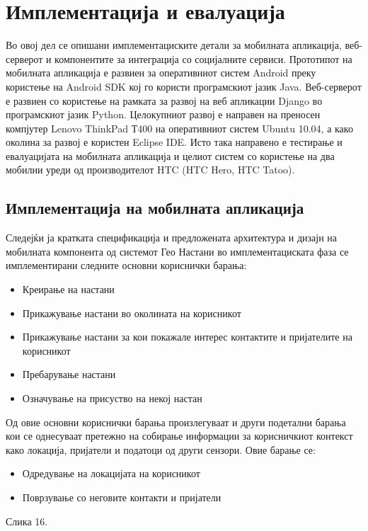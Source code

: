 \chapter{Имплементација и евалуација} 

Во овој дел се опишани имплементациските детали за мобилната апликација,
веб-серверот и компонентите за интеграција со социјалните сервиси. Прототипот на мобилната апликација е развиен за
оперативниот систем Android преку користење на Android SDK кој го користи
програмскиот јазик Java. Веб-серверот е развиен со користење на рамката за
развој на веб апликации Django во програмскиот јазик Python. Целокупниот развој
е направен на преносен компјутер Lenovo ThinkPad Т400 на оперативниот систем
Ubuntu 10.04, а како околина за развој е користен Eclipse IDE. Исто така
направено е тестирање и евалуацијата на мобилната апликација и целиот систем со
користење на два мобилни уреди од производителот HTC (HTC Hero, HTC Tatoo). 

\section{Имплементација на мобилната апликација}
Следејќи ја кратката спецификација и предложената архитектура и дизајн на
мобилната компонента од системот Гео Настани во имплементациската фаза се
имплементирани следните основни кориснички барања: 
\begin{itemize}
  \item Креирање на настани
  \item Прикажување настани во околината на
корисникот
  \item Прикажување настани за кои покажале интерес контактите и
пријателите на корисникот 
  \item Пребарување настани 
  \item Означување на присуство
на некој настан 
\end{itemize}
Од овие основни кориснички барања произлегуваат и други подетални
барања кои се однесуваат претежно на собирање информации за корисничкиот
контекст како локација, пријатели и податоци од други сензори. Овие барање се:

\begin{itemize}
  \item Одредување на локацијата на корисникот
  \item Поврзување со неговите контакти и
пријатели  
\end{itemize}


Слика 16. 

